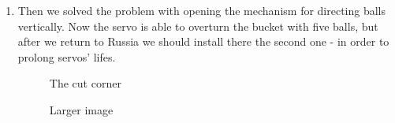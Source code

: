 \begin{enumerate}
	\item Then we solved the problem with opening the mechanism for directing balls vertically. Now the servo is able to overturn the bucket with five balls, but after we return to Russia we should install there the second one - in order to prolong servos' lifes.
	\begin{figure}[H]
		\begin{minipage}[h]{0.47\linewidth}
			\caption{The cut corner}
		\end{minipage}
		\hfill
		\begin{minipage}[h]{0.47\linewidth}
			\caption{Larger image}
		\end{minipage}
	\end{figure}
	

\end{enumerate}
